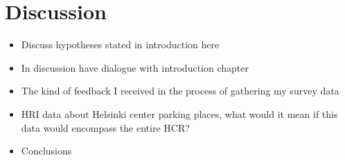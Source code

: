 \section{Discussion}
\justify

\begin{itemize}
  \item Discuss hypotheses stated in introduction here
  \item In discussion have dialogue with introduction chapter
  \item The kind of feedback I received in the process of gathering my survey data
  \item HRI data about Helsinki center parking places, what would it mean if this data would encompass the entire HCR?
  \item Conclusions
\end{itemize}